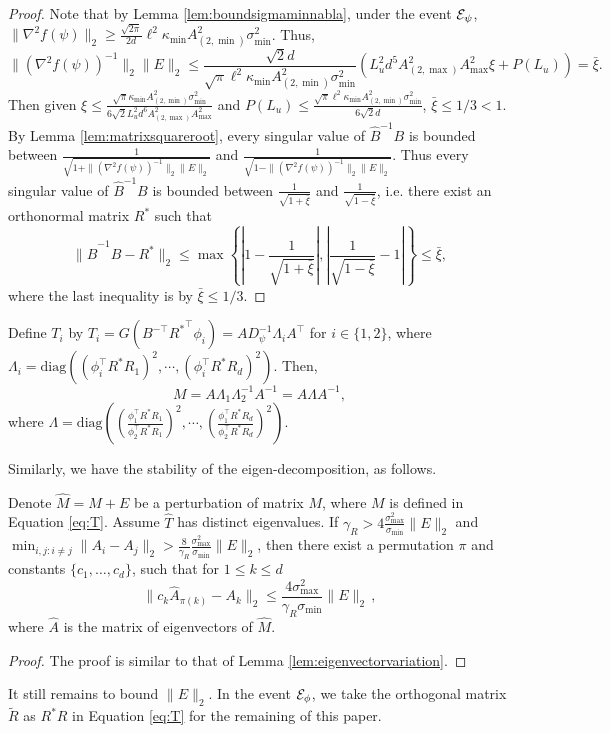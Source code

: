 \begin{proof}
Note that by Lemma \ref{lem:boundsigmaminnabla},  under the event $\mathcal{E}_{\psi}$, $\|\nabla^2f(\psi)\|_2 \ge \frac{\sqrt{2\pi}}{2d}\ell^2\kappa_{\min}A^2_{(2,\min)}\sigma_{\min}^2$. Thus,
\[
\|\left(\nabla^2f(\psi)\right)^{-1}\|_2 \|E\|_2 \le \frac{\sqrt{2}d}{\sqrt{\pi}\ell^2\kappa_{\min}A^2_{(2,\min)}\sigma_{\min}^2}\left(L_u^2d^5 A_{(2,\max)}^2A_{\max}^2\xi + P(L_u)\right) = \bar{\xi}.
\]
Then given $\xi \le \frac{\sqrt{\pi}\kappa_{\min}A^2_{(2,\min)}\sigma_{\min}^2}{6\sqrt{2}L_u^2d^6A_{(2,\max)}^2A_{\max}^2}$
and 
$P(L_u) \le \frac{\sqrt{\pi}\ell^2\kappa_{\min}A^2_{(2,\min)}\sigma_{\min}^2}{6\sqrt{2}d}$, $\bar{\xi} \le 1/3 < 1$. 
By Lemma \ref{lem:matrixsquareroot}, every singular value of $\hat{B}^{-1}B$ is bounded between $\frac{1}{\sqrt{1 + \|\left(\nabla^2f(\psi)\right)^{-1}\|_2 \|E\|_2}}$ and $\frac{1}{\sqrt{1 - \|\left(\nabla^2f(\psi)\right)^{-1}\|_2 \|E\|_2}}$. 
Thus every singular value of $\hat{B}^{-1}B$ is bounded between $\frac{1}{\sqrt{1+\bar{\xi}}}$ and $\frac{1}{\sqrt{1-\bar{\xi}}}$, i.e. there exist an orthonormal matrix $R^*$ such that 
\[
\|\hat{B}^{-1}B - R^*\|_2 \le \max \left\{ \left|1-\frac{1}{\sqrt{1+\bar{\xi}}}\right| , \left|\frac{1}{\sqrt{1-\bar{\xi}}}-1\right| \right\} \le \bar{\xi},
\]
where the last inequality is by $\bar{\xi} \le 1/3$.
\end{proof}

Define $T_i$ by $T_i = G(B^{-\top}{R^*}^{\top}\phi_i) = A D_{\psi}^{-1}\Lambda_iA^{\top}$ for $i \in \{1,2\}$,
where $\Lambda_i = \text{diag}\left((\phi_i^{\top}R^*R_1)^2, \cdots, (\phi_i^{\top}R^*R_d)^2\right)$. 
Then, 
\begin{equation}
\label{eq:T}
M = A \Lambda_1 \Lambda_2^{-1} A^{-1} = A \Lambda A^{-1},
\end{equation}
where $\Lambda = \text{diag}\left((\frac{\phi_1^{\top}R^*R_1}{\phi_2^{\top}R^*R_1})^2, \cdots, (\frac{\phi_1^{\top}R^*R_d}{\phi_2^{\top}R^*R_d})^2\right)$. 

Similarly, we have the stability of the eigen-decomposition, as follows. 
\begin{lemma}
\label{lem:Teigenvectorvariation}
Denote $\hat{M} = M+E$ be a perturbation of matrix $M$, where $M$ is defined in Equation \eqref{eq:T}. 
Assume $\hat{T}$ has distinct eigenvalues. 
If $\gamma_R > 4 \frac{\sigma_{\max}^2}{\sigma_{\min} }\|E\|_2$ and $\min_{i,j:i\neq j} \|A_i - A_j\|_2 > \frac{8}{\gamma_R}\frac{\sigma_{\max}^2}{\sigma_{\min}} \|E\|_2$, then there exist a permutation $\pi$ and constants $\{c_1,\ldots,c_d\}$, such that for $1\le k\le d$
\[
\| c_k\hat{A}_{\pi(k)} - A_k\|_2 \le \frac{4\sigma^2_{\max}}{\gamma_R\sigma_{\min}} \|E\|_2\,,
\]
where $\hat{A}$ is the matrix of eigenvectors of $\hat{M}$. 
\end{lemma}
\begin{proof}
The proof is similar to that of Lemma \ref{lem:eigenvectorvariation}.
\end{proof}
It still remains to bound $\|E\|_2$. In the event $\mathcal{E}_{\phi}$, we take the orthogonal matrix $\tilde{R}$ as $R^*R$ in Equation \ref{eq:T} for the remaining of this paper.

